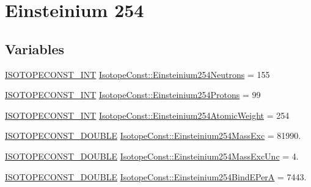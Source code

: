 \hypertarget{group___isotope_const-_einsteinium-_es254}{}\section{Einsteinium 254}
\label{group___isotope_const-_einsteinium-_es254}
\subsection*{Variables}
\begin{DoxyCompactItemize}
\item 
\mbox{\hyperlink{group___isotope_const-_macros_ga5f18360b3e99483a35c32d789e62621c}{I\+S\+O\+T\+O\+P\+E\+C\+O\+N\+S\+T\+\_\+\+I\+NT}} \mbox{\hyperlink{group___isotope_const-_einsteinium-_es254_gac7ebdec7e47bf6f53f046d998592438f}{Isotope\+Const\+::\+Einsteinium254\+Neutrons}} = 155
\item 
\mbox{\hyperlink{group___isotope_const-_macros_ga5f18360b3e99483a35c32d789e62621c}{I\+S\+O\+T\+O\+P\+E\+C\+O\+N\+S\+T\+\_\+\+I\+NT}} \mbox{\hyperlink{group___isotope_const-_einsteinium-_es254_gaf45afd48ead1d426766b16bfa0173618}{Isotope\+Const\+::\+Einsteinium254\+Protons}} = 99
\item 
\mbox{\hyperlink{group___isotope_const-_macros_ga5f18360b3e99483a35c32d789e62621c}{I\+S\+O\+T\+O\+P\+E\+C\+O\+N\+S\+T\+\_\+\+I\+NT}} \mbox{\hyperlink{group___isotope_const-_einsteinium-_es254_ga84379fa63b698044cb8f8c5fe30c779b}{Isotope\+Const\+::\+Einsteinium254\+Atomic\+Weight}} = 254
\item 
\mbox{\hyperlink{group___isotope_const-_macros_ga8f45a7272ce02c0b4c65c44636ed719a}{I\+S\+O\+T\+O\+P\+E\+C\+O\+N\+S\+T\+\_\+\+D\+O\+U\+B\+LE}} \mbox{\hyperlink{group___isotope_const-_einsteinium-_es254_gad540178738c7cd3996c981184a52374f}{Isotope\+Const\+::\+Einsteinium254\+Mass\+Exc}} = 81990.
\item 
\mbox{\hyperlink{group___isotope_const-_macros_ga8f45a7272ce02c0b4c65c44636ed719a}{I\+S\+O\+T\+O\+P\+E\+C\+O\+N\+S\+T\+\_\+\+D\+O\+U\+B\+LE}} \mbox{\hyperlink{group___isotope_const-_einsteinium-_es254_gae9f2a25990f323ec7c4a878410f12233}{Isotope\+Const\+::\+Einsteinium254\+Mass\+Exc\+Unc}} = 4.
\item 
\mbox{\hyperlink{group___isotope_const-_macros_ga8f45a7272ce02c0b4c65c44636ed719a}{I\+S\+O\+T\+O\+P\+E\+C\+O\+N\+S\+T\+\_\+\+D\+O\+U\+B\+LE}} \mbox{\hyperlink{group___isotope_const-_einsteinium-_es254_ga626cd4075548f63c45bf9cb43c76d09b}{Isotope\+Const\+::\+Einsteinium254\+Bind\+E\+PerA}} = 7443.

\end{DoxyCompactItemize}
